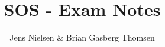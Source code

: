 


\title{\vspace{-2cm} SOS - Exam Notes}
\author{Jens Nielsen \& Brian Gasberg Thomsen}


\maketitle
\tableofcontents

\clearpage

\clearpage

\clearpage

\clearpage

\clearpage

\clearpage

\clearpage

\clearpage

\clearpage

\clearpage

\clearpage

\clearpage



